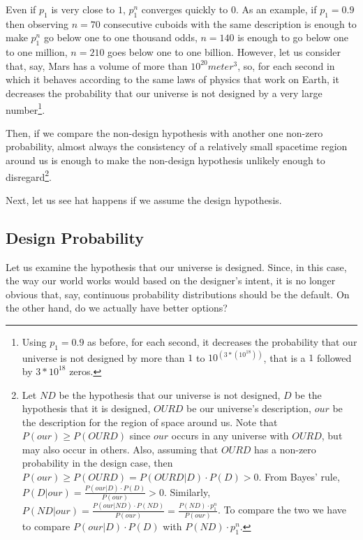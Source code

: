 \documentclass[a4paper
]{article}
\newcommand{\svn}[2][]{\todo[author=Virgil,color=red!25!white,#1]{#2}}
\def\our_description{OURD}
\begin{document}
Even if $p_1$ is very close to $1$, $p_1^n$ converges quickly to $0$.
As an example, if $p_1=0.9$ then observing $n=70$ consecutive cuboids with
the same description is enough to make $p_1^n$ go below one to one thousand
odds, $n=140$ is enough to go below one to one million,
$n=210$ goes below one to one billion. However, let us consider that, say,
Mars has a volume of more than $10^20 meter^3$, so, for each second
in which it behaves according to the same laws of physics that work on
Earth, it decreases the probability that our universe is not designed by a
very large number\footnote{Using $p_1=0.9$ as before, for each second,
it decreases the
probability that our universe is not designed by more than $1$ to
$10^(3*(10^18))$, that is a $1$ followed by $3*10^18$ zeros.}.

Then, if we compare the non-design hypothesis
with another one non-zero probability,
almost always the consistency of a relatively small spacetime region around us
is enough to make the non-design hypothesis unlikely enough to
disregard\footnote{
  Let $ND$ be the hypothesis that our universe is not designed,
  $D$ be the hypothesis that it is designed, $\our_description$ be our
  universe's description,
  $our$ be the description for the region of space around us.
  Note that $P(our) \ge P(\our_description)$ since $our$ occurs in any
  universe with $\our_description$, but may also occur in others. Also, assuming
  that $\our_description$ has a non-zero probability in the design case, then
  $P(our) \ge P(\our_description)=P(\our_description|D)\cdot P(D) > 0$.
  From Bayes' rule, $P(D|our) = \frac{P(our|D)\cdot P(D)}{P(our)} > 0$.
  Similarly,
  $P(ND|our) = \frac{P(our|ND)\cdot P(ND)}{P(our)}
    = \frac{P(ND) \cdot p_1^n}{P(our)}$.
  To compare the two we have to compare
  $P(our|D)\cdot P(D)$ with $P(ND) \cdot p_1^n$.
  }.

Next, let us see hat happens if we assume the design hypothesis.

\subsection{Design Probability}
\label{sec:design-probability}

\svn{merge with unknown designer's intent.}

Let us examine the hypothesis that our universe is designed.
Since, in this case, the way our world works would based
on the designer's intent,
it is no longer obvious that, say, continuous probability distributions
should be the default.
On the other hand, do we actually have better options?
\end{document}
